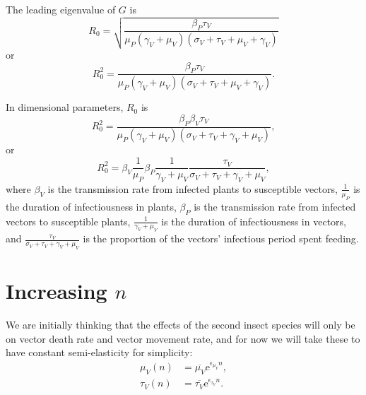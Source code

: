 \documentclass{article}
\newcommand{\me}{\mathrm{e}}
\begin{document}
The leading eigenvalue of $G$ is
\begin{equation}
  R_0 = \sqrt{
    \frac{\beta_P \tau_V}
    {\mu_P (\gamma_V + \mu_V) (\sigma_V + \tau_V + \mu_V + \gamma_V)}
  }
\end{equation}
or
\begin{equation}
  R_0^2 =
  \frac{\beta_P \tau_V}
  {\mu_P (\gamma_V + \mu_V) (\sigma_V + \tau_V + \mu_V + \gamma_V)}.
\end{equation}

In dimensional parameters, $R_0$ is
\begin{equation}
  R_0^2 =
  \frac{\beta_P \beta_V \tau_V}
  {\mu_P \left(\gamma_V + \mu_V\right)
    \left(\sigma_V + \tau_V + \gamma_V + \mu_V\right)},
\end{equation}
or
\begin{equation}
  R_0^2 =
  \beta_V \frac{1}{\mu_P}
  \beta_P
  \frac{1}{\gamma_V + \mu_V}
  \frac{\tau_V}
  {\sigma_V + \tau_V + \gamma_V + \mu_V},
\end{equation}
where $\beta_V$ is the transmission rate from infected plants to
susceptible vectors, $\frac{1}{\mu_P}$ is the duration of
infectiousness in plants, $\beta_P$ is the transmission rate from
infected vectors to susceptible plants, $\frac{1}{\gamma_V + \mu_V}$
is the duration of infectiousness in vectors, and
$\frac{\tau_V}{\sigma_V + \tau_V + \gamma_V + \mu_V}$ is the
proportion of the vectors' infectious period spent feeding.


\section{Increasing $n$}

We are initially thinking that the effects of the second insect
species will only be on vector death rate and vector movement rate,
and for now we will take these to have constant semi-elasticity for
simplicity:
\begin{equation}
  \begin{split}
    \mu_V(n) &= \overline{\mu_V} \me^{\epsilon_{\mu_V} n},
    \\
    \tau_V(n) &= \overline{\tau_V} \me^{\epsilon_{\tau_V} n}.
  \end{split}
\end{equation}
\end{document}
